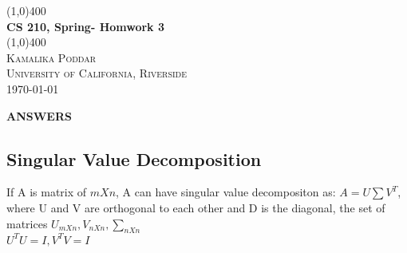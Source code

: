 \documentclass[12pt, oneside]{article}   	%
\begin{document}
	
\begin{titlepage}
	\begin{center}
	\line(1,0){400} \\
    [0.25in]
    \Huge{\bfseries CS 210, Spring- Homwork 3} \\
    [2mm]
    \line(1,0){400} \\
    [3 cm]
    
    \textsc{\LARGE Kamalika Poddar} \\
  
    \textsc{\LARGE University of California, Riverside} \\
    [0.7cm]
  \vspace*{7 cm}
  \today
    \end{center} 

\end{titlepage}

\newpage
\vspace{2cm}

\begin{center}
\textbf{ \Large ANSWERS}\\
\end{center}

\vspace{0.5cm}

\subsection*{Singular Value Decomposition}

If A is matrix of $mXn$, A can have singular value decompositon as: $A=U\sum V^T$, where U and V are orthogonal to each other and  D is the diagonal, the set of matrices  $U_{mXn}, V_{nXn}, \sum_{nXn}$\\
$U^TU=I, V^TV=I$
\end{document}
